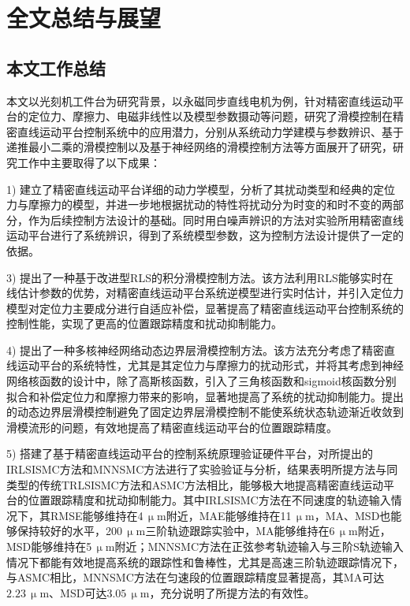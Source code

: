 \chapter{全文总结与展望}
\section{本文工作总结}
本文以光刻机工件台为研究背景，以永磁同步直线电机为例，针对精密直线运动平台的定位力、摩擦力、电磁非线性以及模型参数摄动等问题，研究了滑模控制在精密直线运动平台控制系统中的应用潜力，分别从系统动力学建模与参数辨识、基于递推最小二乘的滑模控制以及基于神经网络的滑模控制方法等方面展开了研究，研究工作中主要取得了以下成果：


1) 建立了精密直线运动平台详细的动力学模型，分析了其扰动类型和经典的定位力与摩擦力的模型，并进一步地根据扰动的特性将扰动分为时变的和时不变的两部分，作为后续控制方法设计的基础。同时用白噪声辨识的方法对实验所用精密直线运动平台进行了系统辨识，得到了系统模型参数，这为控制方法设计提供了一定的依据。

3) 提出了一种基于改进型RLS的积分滑模控制方法。该方法利用RLS能够实时在线估计参数的优势，对精密直线运动平台系统逆模型进行实时估计，并引入定位力模型对定位力主要成分进行自适应补偿，显著提高了精密直线运动平台控制系统的控制性能，实现了更高的位置跟踪精度和扰动抑制能力。

4) 提出了一种多核神经网络动态边界层滑模控制方法。该方法充分考虑了精密直线运动平台的系统特性，尤其是其定位力与摩擦力的扰动形式，并将其考虑到神经网络核函数的设计中，除了高斯核函数，引入了三角核函数和sigmoid核函数分别拟合和补偿定位力和摩擦力带来的影响，显著地提高了系统的扰动抑制能力。提出的动态边界层滑模控制避免了固定边界层滑模控制不能使系统状态轨迹渐近收敛到滑模流形的问题，有效地提高了精密直线运动平台的位置跟踪精度。

5) 搭建了基于精密直线运动平台的控制系统原理验证硬件平台，对所提出的IRLSISMC方法和MNNSMC方法进行了实验验证与分析，结果表明所提方法与同类型的传统TRLSISMC方法和ASMC方法相比，能够极大地提高精密直线运动平台的位置跟踪精度和扰动抑制能力。其中IRLSISMC方法在不同速度的轨迹输入情况下，其RMSE能够维持在4\,$\upmu$m附近，MAE能够维持在11\,$\upmu$m，MA、MSD也能够保持较好的水平，200\,$\upmu$m三阶轨迹跟踪实验中，MA能够维持在6\,$\upmu$m附近，MSD能够维持在5\,$\upmu$m附近；MNNSMC方法在正弦参考轨迹输入与三阶S轨迹输入情况下都能有效地提高系统的跟踪性和鲁棒性，尤其是高速三阶轨迹跟踪情况下，与ASMC相比，MNNSMC方法在匀速段的位置跟踪精度显著提高，其MA可达$2.23\,\upmu$m、MSD可达$3.05\,\upmu$m，充分说明了所提方法的有效性。
